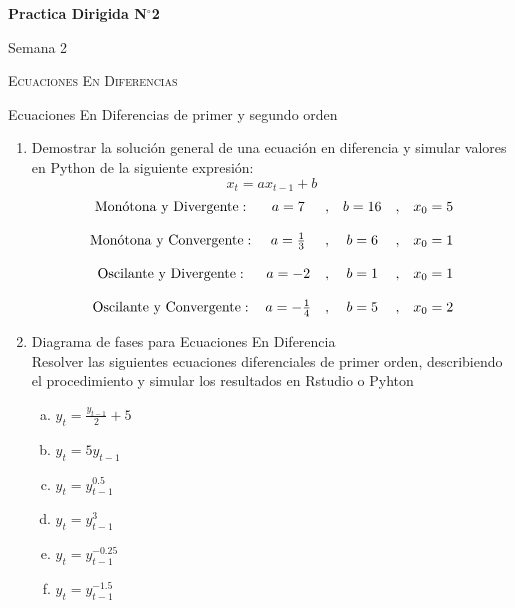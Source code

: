 \documentclass[11pt,a4paper]{article}
\begin{document}
	\begin{center}
		{\Large {\textbf{Practica Dirigida N$^{\circ}$2}}}
		
		\small{Semana 2}
		
		\textsc{Ecuaciones En Diferencias}
		
		Ecuaciones En Diferencias de primer y segundo orden
		
	\end{center}

\begin{enumerate}
		\item Demostrar la solución general de una ecuación en diferencia y simular valores en Python de la siguiente expresión: $$x_{t} = ax_{t-1} + b$$
			\begin{equation*}
				\begin{matrix}
					\textup{Monótona y Divergente}: 	 & a = 7 &, 		   & b=16 &, &x_{0}=5\\
					\\
					\textup{Monótona y Convergente}:	 & a = \frac{1}{3} &,  & b=6  &,  &x_{0}=1\\
					\\
					\textup{Oscilante y Divergente}:  & a = -2 &, 		   & b=1  &,  &x_{0}=1\\
					\\
					\textup{Oscilante y Convergente}: & a = -\frac{1}{4} &, & b=5  &,  &x_{0}=2
				\end{matrix}
			\end{equation*}
		\item Diagrama de fases para Ecuaciones En Diferencia\\
		Resolver las siguientes ecuaciones diferenciales de primer orden, describiendo el procedimiento y simular los resultados en Rstudio o Pyhton
			\begin{multicols}{2}
				\begin{enumerate}[a)]
					\item $y_{t} = \frac{y_{t-1}}{2}+5$
					\item $y_{t} = 5y_{t-1}$
					\item $y_{t} = y_{t-1}^{0.5}$ %
					\item $y_{t} = y_{t-1}^{3}$ %
					\item $y_{t} = y_{t-1}^{-0.25}$ %
					\item $y_{t} = y_{t-1}^{-1.5}$ %

\end{enumerate}
\end{multicols}
\end{enumerate}
\end{document}
